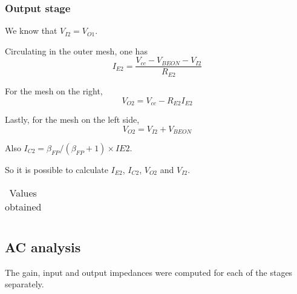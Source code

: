 \subsubsection{Output stage}
We know that $V_{I2}=V_{O1}$.

Circulating in the outer mesh, one has
\begin{equation}
I_{E2} = \frac{V_{cc}-V_{BEON}-V_{I2}}{R_{E2}}
\end{equation}

For the mesh on the right,
\begin{equation}
V_{O2} = V_{cc} -R_{E2} I_{E2}
\end{equation}

Lastly, for the mesh on the left side,
\begin{equation}
V_{O2} = V_{I2} + V_{BEON}
\end{equation}

Also $I_{C2} = \beta_{FP}/(\beta_{FP}+1)\times IE2$.

So it is possible to calculate $I_{E2}$, $I_{C2}$, $V_{O2}$ and $V_{I2}$.

\begin{table}[H]
  \centering
  \begin{tabular}{|c|c|}
    \hline
      
  \end{tabular}
  \caption{Values obtained}
  \label{tab:resultsDC2}
\end{table}





\subsection{AC analysis}
The gain, input and output impedances were computed for each of the stages separately.

